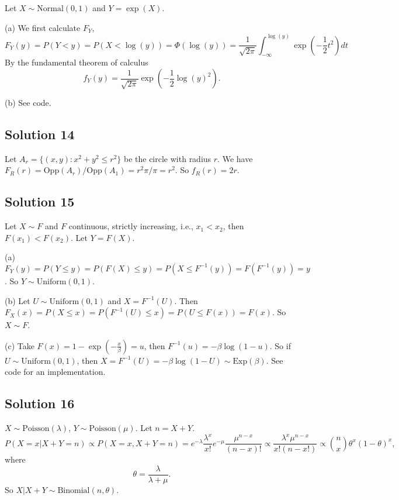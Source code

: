 Let $X \sim \mathrm{Normal}(0, 1)$ and $Y = \exp(X)$.

(a) We first calculate $F_Y$,
\begin{equation*}
F_Y(y) = P(Y < y)
    = P(X < \log(y))
    = \Phi(\log(y))
    = \frac{1}{\sqrt{2\pi}} \int_{-\infty}^{\log(y)} \exp\left(-\frac{1}{2} t^2\right) dt
\end{equation*}
By the fundamental theorem of calculus
$$
f_Y(y) = \frac{1}{\sqrt{2\pi}} \exp\left(-\frac{1}{2} \log(y)^2\right).
$$

(b) See code.


\subsection*{Solution 14}

Let $A_r = \{(x, y) : x^2 + y^2 \leq r^2\}$ be the circle with radius $r$.
We have $F_R(r) = \mathrm{Opp}(A_r) / \mathrm{Opp}(A_1) = r^2 \pi / \pi = r^2$.
So $f_R(r) = 2r$.


\subsection*{Solution 15}

Let $X \sim F$ and $F$ continuous, strictly increasing, i.e., $x_1 < x_2$, then $F(x_1) < F(x_2)$.
Let $Y = F(X)$.

(a) $F_Y(y) = P(Y \leq y) = P(F(X) \leq y) = P(X \leq F^{-1}(y)) = F(F^{-1}(y)) = y$.
So $Y \sim \mathrm{Uniform}(0, 1)$.

(b) Let $U \sim \mathrm{Uniform}(0, 1)$ and $X = F^{-1}(U)$.
Then $F_X(x) = P(X \leq x) = P(F^{-1}(U) \leq x) = P(U \leq F(x)) = F(x)$.
So $X \sim F$.

(c) Take $F(x) = 1 - \exp(-\frac{x}{\beta}) = u$, then $F^{-1}(u) = -\beta \log(1 - u)$.
So if $U \sim \mathrm{Uniform}(0, 1)$, then $X = F^{-1}(U) = -\beta \log(1 - U) \sim \mathrm{Exp}(\beta)$.
See code for an implementation.


\subsection*{Solution 16}

$X \sim \mathrm{Poisson}(\lambda)$, $Y \sim \mathrm{Poisson}(\mu)$.
Let $n = X + Y$.
\begin{equation*}
    P(X = x | X + Y = n) \propto P(X = x, X + Y = n)
        = e^{-\lambda} \frac{\lambda^x}{x!} e^{-\mu} \frac{\mu^{n-x}}{(n - x)!}
        \propto \frac{\lambda^x \mu^{n-x}}{x!(n-x!)}
        \propto \binom{n}{x} \theta^x (1 - \theta)^x,
\end{equation*}
where
\begin{equation*}
    \theta = \frac{\lambda}{\lambda + \mu}.
\end{equation*}
So $X|X+Y \sim \mathrm{Binomial}(n, \theta)$.


